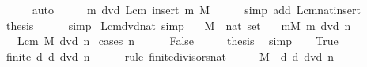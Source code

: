 \begin{isabellebody}
\ \ \ \ \isamarkupfalse%
\ auto\isanewline
\ \ \isamarkupfalse%
\ \isamarkupfalse%
\ {\isachardoublequoteopen}m\ dvd\ Lcm\ {\isacharparenleft}{\kern0pt}insert\ m\ M{\isacharparenright}{\kern0pt}{\isachardoublequoteclose}\isanewline
\ \ \ \ \isamarkupfalse%
\ {\isacharparenleft}{\kern0pt}simp\ add{\isacharcolon}{\kern0pt}\ Lcm{\isacharunderscore}{\kern0pt}nat{\isacharunderscore}{\kern0pt}insert{\isacharparenright}{\kern0pt}\isanewline
\ \ \isamarkupfalse%
\ \isamarkupfalse%
\ {\isacharquery}{\kern0pt}thesis\isanewline
\ \ \ \ \isamarkupfalse%
\ simp\isanewline
{}\isamarkupfalse%
%
\endisatagproof
{\isafoldproof}%
%
\isadelimproof
\isanewline
%
\endisadelimproof
\isanewline
{}\isamarkupfalse%
\ Lcm{\isacharunderscore}{\kern0pt}dvd{\isacharunderscore}{\kern0pt}nat\ {\isacharbrackleft}{\kern0pt}simp{\isacharbrackright}{\kern0pt}{\isacharcolon}{\kern0pt}\isanewline
\ \ \ M\ {\isacharcolon}{\kern0pt}{\isacharcolon}{\kern0pt}\ {\isachardoublequoteopen}nat\ set{\isachardoublequoteclose}\isanewline
\ \ \ {\isachardoublequoteopen}{\isasymforall}m{\isasymin}M{\isachardot}{\kern0pt}\ m\ dvd\ n{\isachardoublequoteclose}\isanewline
\ \ \ {\isachardoublequoteopen}Lcm\ M\ dvd\ n{\isachardoublequoteclose}\isanewline
%
\isadelimproof
%
\endisadelimproof
%
\isatagproof
{}\isamarkupfalse%
\ {\isacharparenleft}{\kern0pt}cases\ {\isachardoublequoteopen}n\ {\isachargreater}{\kern0pt}\ {}{\isachardoublequoteclose}{\isacharparenright}{\kern0pt}\isanewline
\ \ \isamarkupfalse%
\ False\isanewline
\ \ \isamarkupfalse%
\ \isamarkupfalse%
\ {\isacharquery}{\kern0pt}thesis\ \isamarkupfalse%
\ simp\isanewline
{}\isamarkupfalse%
\isanewline
\ \ \isamarkupfalse%
\ True\isanewline
\ \ \isamarkupfalse%
\ \isamarkupfalse%
\ {\isachardoublequoteopen}finite\ {\isacharbraceleft}{\kern0pt}d{\isachardot}{\kern0pt}\ d\ dvd\ n{\isacharbraceright}{\kern0pt}{\isachardoublequoteclose}\isanewline
\ \ \ \ \isamarkupfalse%
\ {\isacharparenleft}{\kern0pt}rule\ finite{\isacharunderscore}{\kern0pt}divisors{\isacharunderscore}{\kern0pt}nat{\isacharparenright}{\kern0pt}\isanewline
\ \ \isamarkupfalse%
\ \isamarkupfalse%
\ {\isachardoublequoteopen}M\ {\isasymsubseteq}\ {\isacharbraceleft}{\kern0pt}d{\isachardot}{\kern0pt}\ d\ dvd\ n{\isacharbraceright}{\kern0pt}{\isachardoublequoteclose}\isanewline

\end{isabellebody}
